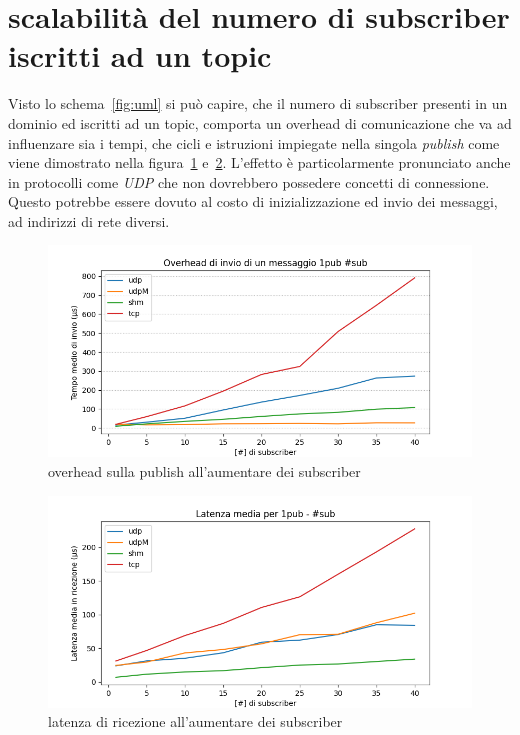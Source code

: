 \section{scalabilità del numero di subscriber iscritti ad un topic}
Visto lo schema~\ref{fig:uml} si può capire, che il numero di subscriber presenti in un dominio ed iscritti ad un topic, comporta un overhead di comunicazione che va ad influenzare sia i tempi, che cicli e istruzioni impiegate nella singola \emph{publish} come viene dimostrato nella figura~\ref{fig:test3_overhead} e~\ref{fig:test3_latenza}. L'effetto è particolarmente pronunciato anche in protocolli come \emph{UDP} che non dovrebbero possedere concetti di connessione. Questo potrebbe essere dovuto al costo di inizializzazione ed invio dei messaggi, ad indirizzi di rete diversi.
\begin{figure}[H]
    \centering
    \includegraphics[width=\textwidth]{./results/test3_sending_multiplesub.png} %
    \caption{overhead sulla publish all'aumentare dei subscriber}\label{fig:test3_overhead}
\end{figure}
\begin{figure}[H]
    \centering
    \includegraphics[width=\textwidth]{./results/test3_sendingreceiving_multiplesub.png} 
    \caption{latenza di ricezione all'aumentare dei subscriber}\label{fig:test3_latenza}
\end{figure}

